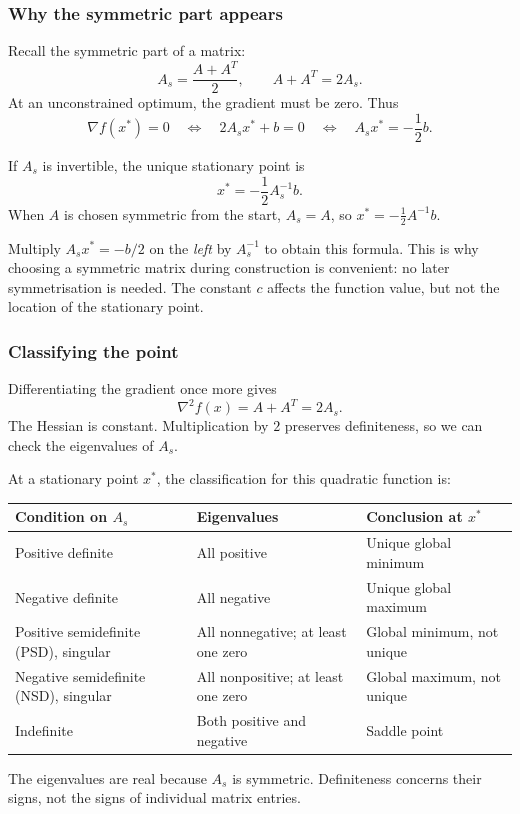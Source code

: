 \subsubsection*{Why the symmetric part appears}
Recall the symmetric part of a matrix:
\[
	A_s=\frac{A+A^T}{2},\qquad A+A^T=2A_s.
\]
At an unconstrained optimum, the gradient must be zero. Thus
\[
	\nabla f(x^*)=0
	\quad\Longleftrightarrow\quad 2A_sx^*+b=0
	\quad\Longleftrightarrow\quad A_sx^*=-\frac12b.
\]
\begin{theorem}\label{thm:lec10-stationary}
	If $A_s$ is invertible, the unique stationary point is
	\begin{equation}\label{eq:lec10-stationary}
		\boxed{x^*=-\frac12A_s^{-1}b.}
	\end{equation}
	When $A$ is chosen symmetric from the start, $A_s=A$, so $x^*=-\tfrac12A^{-1}b$.
\end{theorem}
Multiply $A_sx^*=-b/2$ on the \emph{left} by $A_s^{-1}$ to obtain this formula. This is why choosing a symmetric matrix during construction is convenient: no later symmetrisation is needed. The constant $c$ affects the function value, but not the location of the stationary point.

\subsubsection*{Classifying the point}
Differentiating the gradient once more gives
\[
    \boxed{\nabla^2 f(x)=A+A^T=2A_s.}
\]
The Hessian is constant. Multiplication by $2$ preserves definiteness, so we can check the eigenvalues of $A_s$.

At a stationary point $x^*$, the classification for this quadratic function is:
\begin{center}
    \renewcommand{\arraystretch}{1.3}
    \begin{tabular}{@{}p{3.8cm}p{4cm}p{4.5cm}@{}}
        \toprule
        Condition on $A_s$ & Eigenvalues & Conclusion at $x^*$ \\
        \midrule
        Positive definite & All positive & Unique global minimum \\
        Negative definite & All negative & Unique global maximum \\
        Positive semidefinite (PSD), singular & All nonnegative; at least one zero & Global minimum, not unique \\
        Negative semidefinite (NSD), singular & All nonpositive; at least one zero & Global maximum, not unique \\
        Indefinite & Both positive and negative & Saddle point \\
        \bottomrule
    \end{tabular}
\end{center}
The eigenvalues are real because $A_s$ is symmetric. Definiteness concerns their signs, not the signs of individual matrix entries.

